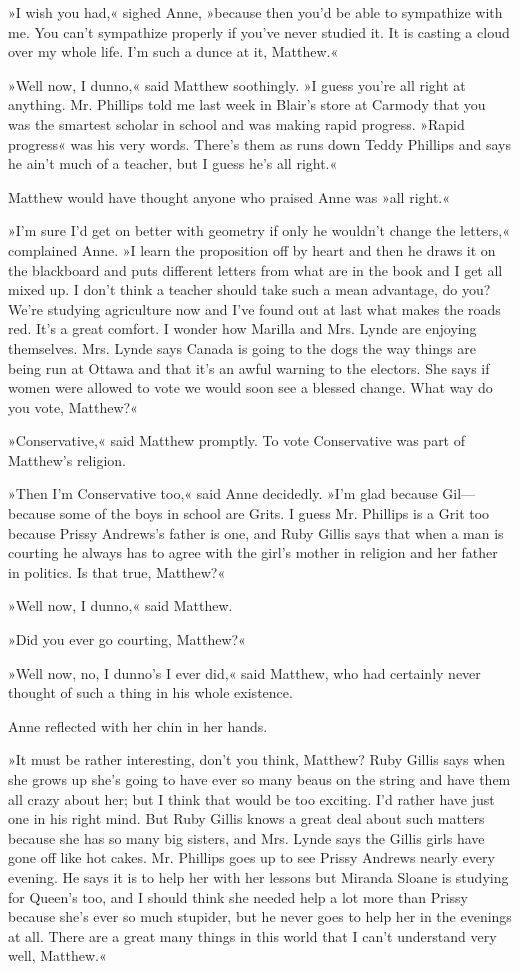 »I wish you had,« sighed Anne, »because then you’d be able to sympathize with me. You can’t sympathize properly if you’ve never studied it. It is casting a cloud over my whole life. I’m such a dunce at it, Matthew.«

»Well now, I dunno,« said Matthew soothingly. »I guess you’re all right at anything. Mr. Phillips told me last week in Blair’s store at Carmody that you was the smartest scholar in school and was making rapid progress. »Rapid progress« was his very words. There’s them as runs down Teddy Phillips and says he ain’t much of a teacher, but I guess he’s all right.«

Matthew would have thought anyone who praised Anne was »all right.«

»I’m sure I’d get on better with geometry if only he wouldn’t change the letters,« complained Anne. »I learn the proposition off by heart and then he draws it on the blackboard and puts different letters from what are in the book and I get all mixed up. I don’t think a teacher should take such a mean advantage, do you? We’re studying agriculture now and I’ve found out at last what makes the roads red. It’s a great comfort. I wonder how Marilla and Mrs. Lynde are enjoying themselves. Mrs. Lynde says Canada is going to the dogs the way things are being run at Ottawa and that it’s an awful warning to the electors. She says if women were allowed to vote we would soon see a blessed change. What way do you vote, Matthew?«

»Conservative,« said Matthew promptly. To vote Conservative was part of Matthew’s religion.

»Then I’m Conservative too,« said Anne decidedly. »I’m glad because Gil—because some of the boys in school are Grits. I guess Mr. Phillips is a Grit too because Prissy Andrews’s father is one, and Ruby Gillis says that when a man is courting he always has to agree with the girl’s mother in religion and her father in politics. Is that true, Matthew?«

»Well now, I dunno,« said Matthew.

»Did you ever go courting, Matthew?«

»Well now, no, I dunno’s I ever did,« said Matthew, who had certainly never thought of such a thing in his whole existence.

Anne reflected with her chin in her hands.

»It must be rather interesting, don’t you think, Matthew? Ruby Gillis says when she grows up she’s going to have ever so many beaus on the string and have them all crazy about her; but I think that would be too exciting. I’d rather have just one in his right mind. But Ruby Gillis knows a great deal about such matters because she has so many big sisters, and Mrs. Lynde says the Gillis girls have gone off like hot cakes. Mr. Phillips goes up to see Prissy Andrews nearly every evening. He says it is to help her with her lessons but Miranda Sloane is studying for Queen’s too, and I should think she needed help a lot more than Prissy because she’s ever so much stupider, but he never goes to help her in the evenings at all. There are a great many things in this world that I can’t understand very well, Matthew.«

